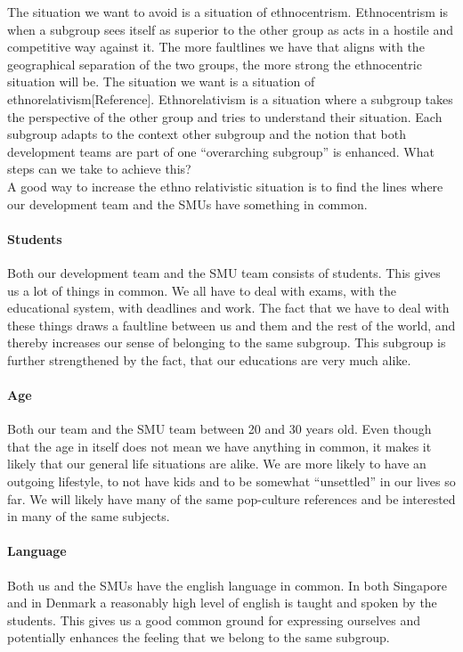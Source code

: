 \documentclass[a4paper,11pt,report]{article}
\begin{document}
The situation we want to avoid is a situation of ethnocentrism. Ethnocentrism is when a subgroup sees itself as superior to the other group as acts in a hostile and competitive way against it. The more faultlines we have that aligns with the geographical separation of the two groups, the more strong the ethnocentric situation will be. The situation we want is a situation of ethnorelativism[Reference]. Ethnorelativism is a situation where a subgroup takes the perspective of the other group and tries to understand their situation. Each subgroup adapts to the context other subgroup and the notion that both development teams are part of one “overarching subgroup” is enhanced. What steps can we take to achieve this?\\

A good way to increase the ethno relativistic situation is to find the lines where our development team and the SMUs have something in common. \\

\paragraph{Students}
Both our development team and the SMU team consists of students. This gives us a lot of things in common. We all have to deal with exams, with the educational system, with deadlines and work. The fact that we have to deal with these things draws a faultline between us and them and the rest of the world, and thereby increases our sense of belonging to the same subgroup. This subgroup is further strengthened by the fact, that our educations are very much alike. \\

\paragraph{Age}
Both our team and the SMU team between 20 and 30 years old. Even though that the age in itself does not mean we have anything in common, it makes it likely that our general life situations are alike. We are more likely to have an outgoing lifestyle, to not have kids and to be somewhat “unsettled” in our lives so far. We will likely have many of the same pop-culture references and be interested in many of the same subjects. 

\paragraph{Language}
Both us and the SMUs have the english language in common. In both Singapore and in Denmark a reasonably high level of english is taught and spoken by the students. This gives us a good common ground for expressing ourselves and potentially enhances the feeling that we belong to the same subgroup. \\
\end{document}
